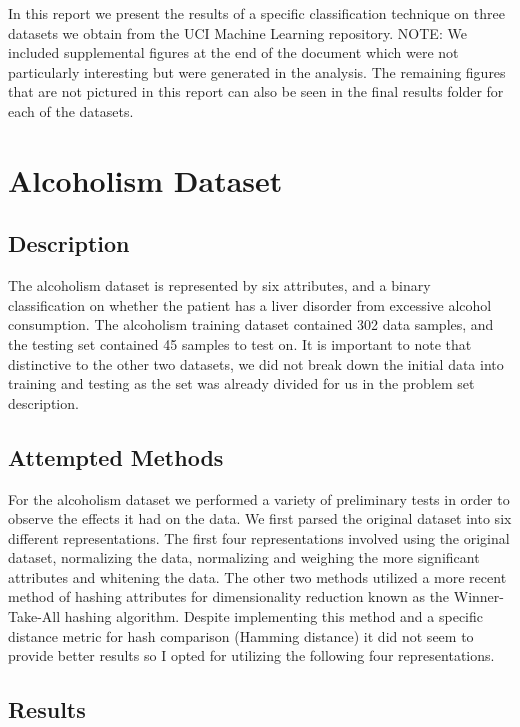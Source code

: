 \documentclass[conference]{acmsiggraph}
\begin{document}
In this report we present the results of a specific classification technique on three datasets we obtain from the UCI Machine Learning repository. NOTE: We included supplemental figures at the end of the document which were not particularly interesting but were generated in the analysis. The remaining figures that are not pictured in this report can also be seen in the final results folder for each of the datasets.

\section{Alcoholism Dataset}
\subsection{Description}
The alcoholism dataset is represented by six attributes, and a binary classification on whether the patient has a liver disorder from excessive alcohol consumption. The alcoholism training dataset contained 302 data samples, and the testing set contained 45 samples to test on. It is important to note that distinctive to the other two datasets, we did not break down the initial data into training and testing as the set was already divided for us in the problem set description.
\subsection {Attempted Methods}
For the alcoholism dataset we performed a variety of preliminary tests in order to observe the effects it had on the data. We first parsed the original dataset into six different representations. The first four representations involved using the original dataset, normalizing the data, normalizing and weighing the more significant attributes and whitening the data. The other two methods utilized a more recent method of hashing attributes for dimensionality reduction known as the Winner-Take-All hashing algorithm\cite{yagnik2011power}. Despite implementing this method and a specific distance metric for hash comparison (Hamming distance) it did not seem to provide better results so I opted for utilizing the following four representations.
\subsection {Results}
\end{document}
